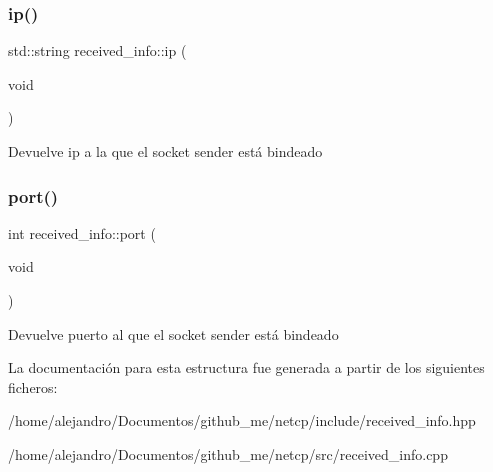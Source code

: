 \subsubsection{\texorpdfstring{ip()}{ip()}}
{\footnotesize\ttfamily std\+::string received\+\_\+info\+::ip (\begin{DoxyParamCaption}\item[{void}]{ }\end{DoxyParamCaption})}

\begin{DoxyReturn}{Devuelve}
ip a la que el socket sender está bindeado 
\end{DoxyReturn}
\mbox{\label{structreceived__info_a477d71d73917e058813ccf4ebb5f0269}} 
\subsubsection{\texorpdfstring{port()}{port()}}
{\footnotesize\ttfamily int received\+\_\+info\+::port (\begin{DoxyParamCaption}\item[{void}]{ }\end{DoxyParamCaption})}

\begin{DoxyReturn}{Devuelve}
puerto al que el socket sender está bindeado 
\end{DoxyReturn}


La documentación para esta estructura fue generada a partir de los siguientes ficheros\+:\begin{DoxyCompactItemize}
\item 
/home/alejandro/\+Documentos/github\+\_\+me/netcp/include/received\+\_\+info.\+hpp\item 
/home/alejandro/\+Documentos/github\+\_\+me/netcp/src/received\+\_\+info.\+cpp\end{DoxyCompactItemize}
